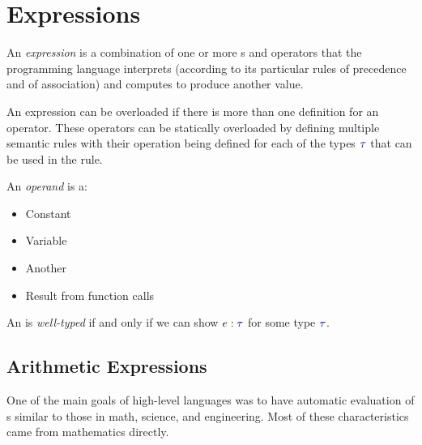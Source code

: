 \section{Expressions}\label{sec:Expressions}
\begin{definition}[Expression]\label{def:Expression}
  An \emph{expression} is a combination of one or more s and operators that the programming language interprets (according to its particular rules of precedence and of association) and computes to produce another value.

  \begin{remark}[Overloading]\label{rmk:Overloading_Expressions}
    An expression can be overloaded if there is more than one definition for an operator.
    These operators can be statically overloaded by defining multiple semantic rules with their operation being defined for each of the types $\DataType$ that can be used in the rule.
  \end{remark}
\end{definition}

\begin{definition}[Operand]\label{def:Operand}
  An \emph{operand} is a:
  \begin{itemize}[noitemsep]
  \item Constant
  \item Variable
  \item Another 
  \item Result from function calls
  \end{itemize}
\end{definition}

\begin{definition}\label{def:Well_Typed_Expression}
  An  is \emph{well-typed} if and only if we can show $e : \DataType$ for some type $\DataType$.
\end{definition}

\subsection{Arithmetic Expressions}\label{subsec:Arithmetic_Expressions}
One of the main goals of high-level languages was to have automatic evaluation of s similar to those in math, science, and engineering.
Most of these characteristics came from mathematics directly.

